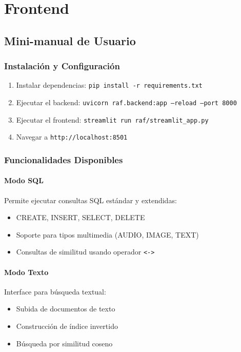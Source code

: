 \documentclass[a4paper,12pt]{report}
\begin{document}
\chapter{Frontend}
\section{Mini-manual de Usuario}
\subsection{Instalación y Configuración}
\begin{enumerate}
\item Instalar dependencias: \texttt{pip install -r requirements.txt}
\item Ejecutar el backend: \texttt{uvicorn raf.backend:app --reload --port 8000}
\item Ejecutar el frontend: \texttt{streamlit run raf/streamlit\_app.py}
\item Navegar a \texttt{http://localhost:8501}
\end{enumerate}

\subsection{Funcionalidades Disponibles}
\subsubsection{Modo SQL}
Permite ejecutar consultas SQL estándar y extendidas:
\begin{itemize}
\item CREATE, INSERT, SELECT, DELETE
\item Soporte para tipos multimedia (AUDIO, IMAGE, TEXT)
\item Consultas de similitud usando operador \texttt{<->}
\end{itemize}

\subsubsection{Modo Texto}
Interface para búsqueda textual:
\begin{itemize}
\item Subida de documentos de texto
\item Construcción de índice invertido
\item Búsqueda por similitud coseno
\end{itemize}
\end{document}
